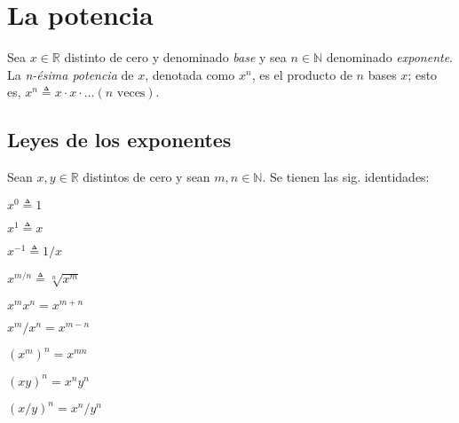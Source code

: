 \chapter{La potencia}

Sea \(x\in\mathbb{R}\) distinto de cero y denominado \emph{base} y sea \(n\in\mathbb{N}\) denominado \emph{exponente}. 
La \emph{n-ésima potencia} de \(x\), denotada como \(x^n\), es el producto de \(n\) bases \(x\); esto es, \(x^n\triangleq x\cdot x\cdot\dots(n\text{ veces})\).

\section{Leyes de los exponentes}

Sean \(x,y\in\mathbb{R}\) distintos de cero y sean \(m,n\in\mathbb{N}\).
Se tienen las sig. identidades:
\begin{enumerate}
  \begin{multicols}{3}
    \item \(x^{0}\triangleq1\)
    \item \(x^{1}\triangleq x\)
    \item \(x^{-1}\triangleq1/x\)
    \item \(x^{m/n}\triangleq\sqrt[n]{x^{m}}\)
    \item \(x^{m}x^{n}=x^{m+n}\)
    \item \(x^{m}/x^{n}=x^{m-n}\)
    \item \((x^{m})^{n}=x^{mn}\)
    \item \((xy)^{n}=x^{n}y^{n}\)
    \item \((x/y)^{n}=x^{n}/y^{n}\)
  \end{multicols}
\end{enumerate}

